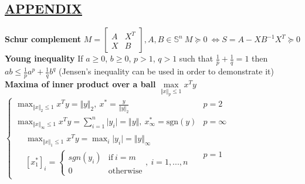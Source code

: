 \documentclass[a4paper]{article}
\begin{document}
\subsection*{\underline{APPENDIX}}
\textbf{Schur complement} $M=\begin{bmatrix}
    A&X^T\\
    X&B
\end{bmatrix}, A,B\in\mathbb{S}^n \ M\succeq0 \  \iff S=A-XB^{-1}X^T\succeq0$  \\
\textbf{Young inequality} If $a\ge0$, $b\ge0$, $p>1$, $q>1$ such that $\frac{1}{p}+\frac{1}{q}=1$ then $ab \le \frac{1}{p}{a^p}+\frac{1}{q}{b^q}$ \textsf{(Jensen's inequality can be used in order to demonstrate it)}\\
\textbf{Maxima of inner product over a ball} $\underset{\Vert x \Vert_p \le 1}{\max} x^Ty$ $\begin{cases}
    \max_{\Vert x \Vert_2\le1}{x^T{y}}=\Vert{y}\Vert_2, \ x^{*}=\frac{y}{\Vert{y}\Vert_2}&{p=2}\\
    \max_{\Vert{x}\Vert_\infty\le1}{x^T{y}}=\sum_{i=1}^{n}{\vert{y_i}\vert}=\Vert{y}\Vert, \ x^{*}_\infty=\text{sgn}(y)&{p=\infty}\\
    \begin{aligned}
        &\max_{\Vert{x}\Vert_1\le{1}}{x^T{y}}=\max_i{\vert{y_i}\vert}=\Vert{y}\Vert_\infty \\
        &[x_1^{*}]_i=\begin{cases}
           sgn(y_i)&\text{if} \ i=m\\
           0&\text{otherwise}
       \end{cases}, \ i=1,...,n
    \end{aligned}&p=1
   
\end{cases}$
\end{document}
